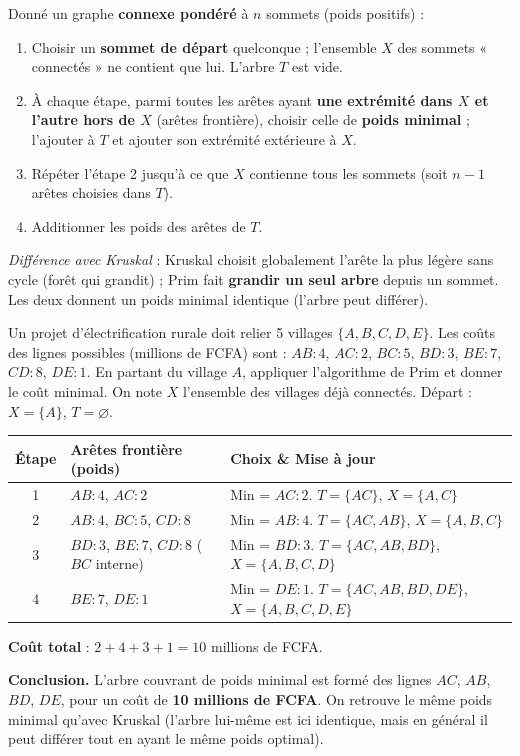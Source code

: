 \documentclass[11pt]{article}
\newcommand{\cle}[1]{{\popxbold\color{popdark}#1}}
\begin{document}
\begin{methode}
Donné un graphe \textbf{connexe pondéré} à $n$ sommets (poids positifs) :
\begin{enumerate}
\item Choisir un \textbf{sommet de départ} quelconque ; l'ensemble $X$ des sommets « connectés » ne contient que lui. L'arbre $T$ est vide.
\item À chaque étape, parmi toutes les arêtes ayant \textbf{une extrémité dans $X$ et l'autre hors de $X$} (arêtes \cle{frontière}), choisir celle de \textbf{poids minimal} ; l'ajouter à $T$ et ajouter son extrémité extérieure à $X$.
\item Répéter l'étape 2 jusqu'à ce que $X$ contienne tous les sommets (soit $n-1$ arêtes choisies dans $T$).
\item Additionner les poids des arêtes de $T$.
\end{enumerate}
\emph{Différence avec Kruskal} : Kruskal choisit globalement l'arête la plus légère sans cycle (forêt qui grandit) ; Prim fait \textbf{grandir un seul arbre} depuis un sommet. Les deux donnent un poids minimal identique (l'arbre peut différer).
\end{methode}

\begin{exoresolu}
Un projet d'électrification rurale doit relier 5 villages $\{A,B,C,D,E\}$. Les coûts des lignes possibles (millions de FCFA) sont : $AB:4$, $AC:2$, $BC:5$, $BD:3$, $BE:7$, $CD:8$, $DE:1$. En partant du village $A$, appliquer l'algorithme de Prim et donner le coût minimal.
\tcblower
On note $X$ l'ensemble des villages déjà connectés. Départ : $X = \{A\}$, $T = \varnothing$.

\begin{center}
\begin{tabularx}{\linewidth}{|c|l|X|}
\hline
\rowcolor{popblueL} \textbf{Étape} & \textbf{Arêtes frontière (poids)} & \textbf{Choix \& Mise à jour} \\
\hline
1 & $AB:4$, $AC:2$ & Min = $AC:2$. $T=\{AC\}$, $X=\{A,C\}$ \\
\hline
2 & $AB:4$, $BC:5$, $CD:8$ & Min = $AB:4$. $T=\{AC, AB\}$, $X=\{A,B,C\}$ \\
\hline
3 & $BD:3$, $BE:7$, $CD:8$ ($BC$ interne) & Min = $BD:3$. $T=\{AC, AB, BD\}$, $X=\{A,B,C,D\}$ \\
\hline
4 & $BE:7$, $DE:1$ & Min = $DE:1$. $T=\{AC, AB, BD, DE\}$, $X=\{A,B,C,D,E\}$ \\
\hline
\end{tabularx}
\end{center}

\textbf{Coût total} : $2 + 4 + 3 + 1 = 10$ millions de FCFA.

\textbf{Conclusion.} L'arbre couvrant de poids minimal est formé des lignes $AC$, $AB$, $BD$, $DE$, pour un coût de \textbf{10 millions de FCFA}. On retrouve le même poids minimal qu'avec Kruskal (l'arbre lui-même est ici identique, mais en général il peut différer tout en ayant le même poids optimal).
\end{exoresolu}
\end{document}
